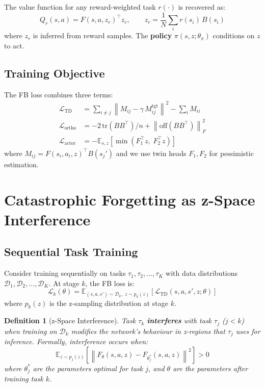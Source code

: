 \documentclass[11pt]{article}
\newcommand{\E}{\mathbb{E}}
\newcommand{\loss}{\mathcal{L}}
\newcommand{\D}{\mathcal{D}}
\newcommand{\tr}{\mathrm{tr}}
\newtheorem{definition}{Definition}
\begin{document}
The value function for any reward-weighted task $r(\cdot)$ is recovered as:
\begin{equation}
    Q_r(s, a) = F(s, a, z_r)^\top z_r, \qquad z_r = \frac{1}{N}\sum_{i} r(s_i)\, B(s_i)
\end{equation}
where $z_r$ is inferred from reward samples. The \textbf{policy} $\pi(s, z; \theta_\pi)$ conditions on $z$ to act.

\subsection{Training Objective}

The FB loss combines three terms:
\begin{align}
    \loss_{\text{TD}} &= \sum_{i \neq j} \left\| M_{ij} - \gamma\, M^{\text{tgt}}_{ij} \right\|^2 - \sum_i M_{ii} \label{eq:td}\\
    \loss_{\text{ortho}} &= -2\,\tr(BB^\top)/n + \left\| \text{off}(BB^\top) \right\|_F^2 \label{eq:ortho}\\
    \loss_{\text{actor}} &= -\E_{s,z}\left[\min(F_1^\top z,\; F_2^\top z)\right] \label{eq:actor}
\end{align}
where $M_{ij} = F(s_i, a_i, z)^\top B(s_j')$ and we use twin heads $F_1, F_2$ for pessimistic estimation.

\section{Catastrophic Forgetting as z-Space Interference}

\subsection{Sequential Task Training}

Consider training sequentially on tasks $\tau_1, \tau_2, \ldots, \tau_K$ with data distributions $\D_1, \D_2, \ldots, \D_K$. At stage $k$, the FB loss is:
\begin{equation}
    \loss_k(\theta) = \E_{(s,a,s') \sim \D_k,\; z \sim p_k(z)} \left[ \loss_{\text{TD}}(s, a, s', z; \theta) \right]
\end{equation}
where $p_k(z)$ is the z-sampling distribution at stage $k$.

\begin{definition}[z-Space Interference]
Task $\tau_k$ \textbf{interferes} with task $\tau_j$ ($j < k$) when training on $\D_k$ modifies the network's behaviour in z-regions that $\tau_j$ uses for inference. Formally, interference occurs when:
\begin{equation}
    \E_{z \sim p_j(z)} \left[ \left\| F_\theta(s, a, z) - F_{\theta_j^*}(s, a, z) \right\|^2 \right] > 0
\end{equation}
where $\theta_j^*$ are the parameters optimal for task $j$, and $\theta$ are the parameters after training task $k$.
\end{definition}
\end{document}
